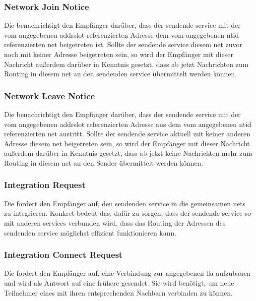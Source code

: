 \isprotocbnbytefield


\subsubsection{Network Join Notice}
\label{dcl-isproto-njn}
Die \msg{\isprotonjn} benachrichtigt den Empfänger darüber, dass der sendende \gls{service} mit der
vom angegebenen \gls{addrslot} referenzierten Adresse dem vom angegebenen \gls{ntid} referenzierten
\gls{net} beigetreten ist. Sollte der sendende \gls{service} diesem \gls{net} zuvor noch mit keiner
Adresse beigetreten sein, so wird der Empfänger mit dieser Nachricht außerdem darüber in Kenntnis
gesetzt, dass ab jetzt Nachrichten zum Routing in diesem \gls{net} an den sendenden \gls{service}
übermittelt werden können.

\isprotonjnbytefield

\subsubsection{Network Leave Notice}
\label{dcl-isproto-nln}
Die \msg{\isprotonln} benachrichtigt den Empfänger darüber, dass der sendende \gls{service} mit der
vom angegebenen \gls{addrslot} referenzierten Adresse aus dem vom angegebenen \gls{ntid}
referenzierten \gls{net} austritt. Sollte der sendende \gls{service} aktuell mit keiner anderen
Adresse diesem \gls{net} beigetreten sein, so wird der Empfänger mit dieser Nachricht außerdem
darüber in Kenntnis gesetzt, dass ab jetzt keine Nachrichten mehr zum Routing in diesem \gls{net}
an den Sender übermittelt werden können.

\isprotonlnbytefield


\subsubsection{Integration Request}
\label{dcl-isproto-ireq}
Die \msg{\isprotoireq} fordert den Empfänger auf, den sendenden \gls{service} in die gemeinsamen
\glspl{net} zu integrieren. Konkret bedeut das, dafür zu sorgen, dass der sendende \gls{service}
so mit anderen \glspl{service} verbunden wird, dass das Routing der Adressen des sendenden
\gls{service} möglichst effizient funktionieren kann.

\isprotoireqbytefield


\subsubsection{Integration Connect Request}
\label{dcl-isproto-icreq}
Die \msg{\isprotoicreq} fordert den Empfänger auf, eine Verbindung zur angegebenen \gls{lla}
aufzubauen und wird als Antwort auf eine frühere \msg{\isprotoireq} gesendet. Sie wird benötigt,
um neue Teilnehmer eines  mit ihren entsprechenden Nachbarn verbinden zu
können.

